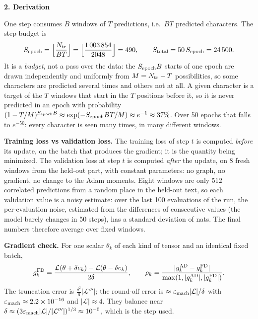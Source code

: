 \documentclass[11pt,a4paper]{article}
\numberwithin{equation}{section}
\newcommand{\stephead}[1]{\par\smallskip\noindent\textbf{\small #1}\par\nobreak}
\begin{document}
\stephead{2. Derivation}
One step consumes $B$ windows of $T$ predictions, i.e.\ $BT$ predicted characters. The step budget is
\begin{equation}
S_{\rm epoch}=\Big\lfloor\frac{N_{\rm tr}}{BT}\Big\rfloor=\Big\lfloor\frac{1\,003\,854}{2048}\Big\rfloor=490,\qquad
S_{\rm total}=50\,S_{\rm epoch}=24\,500 .
\end{equation}
It is a \emph{budget}, not a pass over the data: the $S_{\rm epoch}B$ starts of one epoch are drawn independently and
uniformly from $M=N_{\rm tr}-T$ possibilities, so some characters are predicted several times and others not at all. A given
character is a target of the $T$ windows that start in the $T$ positions before it, so it is never predicted in an epoch with
probability $(1-T/M)^{S_{\rm epoch}B}\approx\exp(-S_{\rm epoch}BT/M)\approx e^{-1}\approx37\%$. Over 50 epochs that falls to
$e^{-50}$: every character is seen many times, in many different windows.

\textbf{Training loss vs validation loss.} The training loss of step $t$ is computed \emph{before} its update, on the
batch that produces the gradient; it is the quantity being minimized. The validation loss at step $t$ is computed
\emph{after} the update, on 8 fresh windows from the held-out part, with constant parameters: no graph, no gradient, no
change to the Adam moments. Eight windows are only $512$ correlated predictions from a random place in the held-out
text, so each validation value is a noisy estimate: over the last 100 evaluations of the run, the per-evaluation noise,
estimated from the differences of consecutive values (the model barely changes in 50 steps), has a standard deviation of
\ValNoise{} nats. The final
numbers therefore average over \NfixedVa{} fixed windows.

\textbf{Gradient check.} For one scalar $\theta_k$ of each kind of tensor and an identical fixed batch,
\begin{equation}
g_k^{\rm FD}=\frac{\mathcal L(\theta+\delta e_k)-\mathcal L(\theta-\delta e_k)}{2\delta},\qquad
\rho_k=\frac{|g_k^{\rm AD}-g_k^{\rm FD}|}{\max(1,|g_k^{\rm AD}|,|g_k^{\rm FD}|)} .
\end{equation}
The truncation error is $\tfrac{\delta^2}6|\mathcal L'''|$; the round-off error is $\approx\varepsilon_{\rm mach}|\mathcal L|/\delta$
with $\varepsilon_{\rm mach}\approx2.2\times10^{-16}$ and $|\mathcal L|\approx4$. They balance near
$\delta\approx(3\varepsilon_{\rm mach}|\mathcal L|/|\mathcal L'''|)^{1/3}\approx10^{-5}$, which is the step used.
\end{document}
